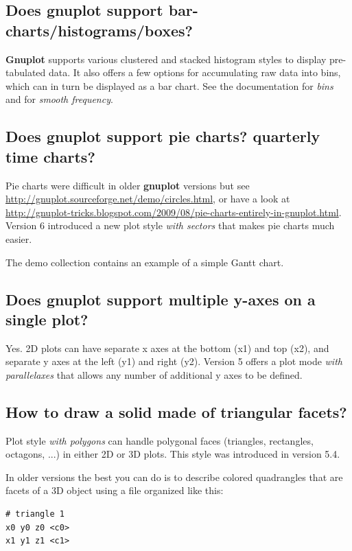 \documentclass[letter,11pt]{article}
\def\http#1{{\small\href{http://#1}{\url{http://#1}}}}
\newcommand{\http}[1]%
            {\htmladdnormallink{\latex{\url{http://#1}}%
                    \html{\textit{http://#1}}}%
                {http://#1}%
            }
\newcommand{\gnuplot}{\textbf{gnuplot }}
\newcommand{\Gnuplot}{\textbf{Gnuplot }}
\begin{document}
{\subsection{Does \gnuplot support bar-charts/histograms/boxes?}

\Gnuplot{} supports various clustered and stacked histogram styles to display
pre-tabulated data.  It also offers a few options for accumulating raw data
into bins, which can in turn be displayed as a bar chart.  See the documentation
for \textit{bins} and for \textit{smooth frequency}.

\subsection{Does \gnuplot support pie charts? quarterly time charts?}

Pie charts were difficult in older \gnuplot versions but see
\http{gnuplot.sourceforge.net/demo/circles.html},
or have a look at
\http{gnuplot-tricks.blogspot.com/2009/08/pie-charts-entirely-in-gnuplot.html}.
Version 6 introduced a new plot style \textit{with sectors} that makes
pie charts much easier.

The demo collection contains an example of a simple Gantt chart.

\subsection{Does \gnuplot support multiple y-axes on a single plot?}

Yes. 2D plots can have separate x axes at the bottom (x1) and top (x2),
and separate y axes at the left (y1) and right (y2).  Version 5 offers a
plot mode \textit{with parallelaxes} that allows any number of additional
y axes to be defined.

\subsection{How to draw a solid made of triangular facets?}

Plot style \textit{with polygons} can handle polygonal faces
(triangles, rectangles, octagons, ...) in either 2D or 3D plots.
This style was introduced in version 5.4.

In older versions the best you can do is to describe colored quadrangles
that are facets of a 3D object using a file organized like this:
\small
\begin{verbatim}
# triangle 1
x0 y0 z0 <c0>
x1 y1 z1 <c1>


\end{verbatim}}
\end{document}
